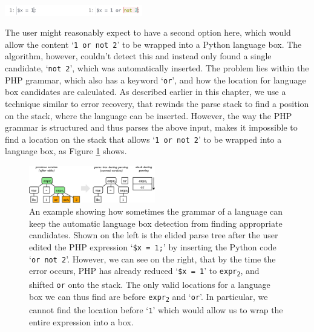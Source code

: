 \documentclass[sigplan,screen]{acmart}\settopmatter{printfolios=true,printccs=false,printacmref=false}
\newcommand{\qtt}[1]{`\texttt{#1}'\xspace}
\begin{document}
\begin{center}
\includegraphics[width=0.45\textwidth]{images/autobox_limitphpgrammar.png}
\end{center}

The user might reasonably expect to have a second option here, which would
allow the content \qtt{1 or not 2} to be wrapped into a Python language box.
The algorithm, however, couldn't detect this and instead only found a single
candidate, \qtt{not 2}, which was automatically inserted.  The problem lies
within the PHP grammar, which also has a keyword \qtt{or}, and how the location
for language box candidates are calculated. As described earlier in this
chapter, we use a technique similar to error recovery, that rewinds the parse
stack to find a position on the stack, where the language can be inserted.
However, the way the PHP grammar is structured and thus parses the above input,
makes it impossible to find a location on the stack that allows \qtt{1 or not
2} to be wrapped into a language box, as Figure \ref{fig_auto_phplimit} shows.

\begin{figure}
\begin{center}
\includegraphics[width=0.49\textwidth]{images/limitation_php}
\end{center}
\caption{An example showing how sometimes the grammar of a language can
keep the automatic language box detection from finding appropriate candidates.
Shown on the left is the elided parse tree after the user edited the PHP expression
\qtt{\$x = 1;} by inserting the Python code \qtt{or not 2}. However, we
can see on the right, that by the time the error occurs, PHP has already reduced \qtt{\$x = 1} to \texttt{expr\textsubscript{2}}, and shifted
\texttt{or} onto the stack. The only valid locations for a language
box we can thus find are before \texttt{expr\textsubscript{2}} and \qtt{or}. In particular,
we cannot find the location before \qtt{1} which would allow us to wrap the entire expression
into a box.}
\label{fig_auto_phplimit}
\end{figure}
\end{document}
